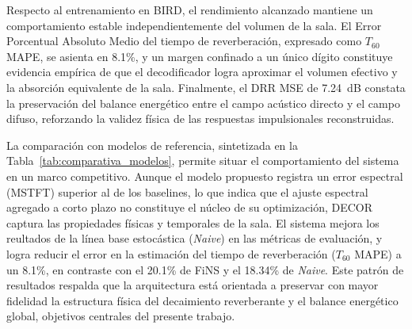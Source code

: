 Respecto al entrenamiento en BIRD, el rendimiento alcanzado mantiene un comportamiento estable independientemente del volumen de la sala. El Error Porcentual Absoluto Medio del tiempo de reverberación, expresado como $T_{60}$ MAPE, se asienta en 8.1\%, y un margen confinado a un único dígito constituye evidencia empírica de que el decodificador logra aproximar el volumen efectivo y la absorción equivalente de la sala. Finalmente, el DRR MSE de 7.24~dB constata la preservación del balance energético entre el campo acústico directo y el campo difuso, reforzando la validez física de las respuestas impulsionales reconstruidas.

La comparación con modelos de referencia, sintetizada en la Tabla~\ref{tab:comparativa_modelos}, permite situar el comportamiento del sistema en un marco competitivo. Aunque el modelo propuesto registra un error espectral (MSTFT) superior al de los baselines, lo que indica que el ajuste espectral agregado a corto plazo no constituye el núcleo de su optimización, DECOR captura  las propiedades físicas y temporales de la sala. El sistema mejora los reultados de  la línea base estocástica (\textit{Naive}) en las métricas de evaluación, y logra reducir el error en la estimación del tiempo de reverberación ($T_{60}$ MAPE) a un 8.1\%, en contraste con el 20.1\% de FiNS y el 18.34\% de \textit{Naive}. Este patrón de resultados respalda que la arquitectura está orientada a preservar con mayor fidelidad la estructura física del decaimiento reverberante y el balance energético global, objetivos centrales del presente trabajo.

\begin{table}[htbp]
\centering
\scriptsize
\setlength{\tabcolsep}{3pt}
\renewcommand{\arraystretch}{1.1}
\caption[Comparativa de métricas]{Comparativa con modelos de referencia en métricas objetivas. Naive representa una línea base estocástica modelada como ruido blanco con una envolvente de decaimiento exponencial, ajustada al $T_{60}$ y energía promedio del conjunto de entrenamiento. FiNS corresponde a la arquitectura propuesta por Steinmetz et al. (2021).}
\label{tab:comparativa_modelos}
\end{table}

